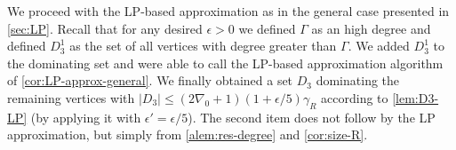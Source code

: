 We proceed with the LP-based approximation as in the general case
presented in \cref{sec:LP}. Recall that for any desired $\epsilon>0$ 
we defined $\Gamma$ as an high degree and defined 
$D_3^1$ as the set of all vertices with degree greater than $\Gamma$. 
We added $D_3^1$ to the dominating set and were able to call the
LP-based approximation algorithm of \cref{cor:LP-approx-general}. We finally
obtained a set $D_3$ dominating the remaining vertices with 
$|D_3|\leq (2\nabla_0+1)(1+\epsilon/5)\gamma_R$ according to \cref{lem:D3-LP} (by applying it with $\epsilon'=\epsilon/5$). The second item does not follow by the LP approximation, but simply from \cref{alem:res-degree} and \cref{cor:size-R}. 

%
%
%
%
%
%


